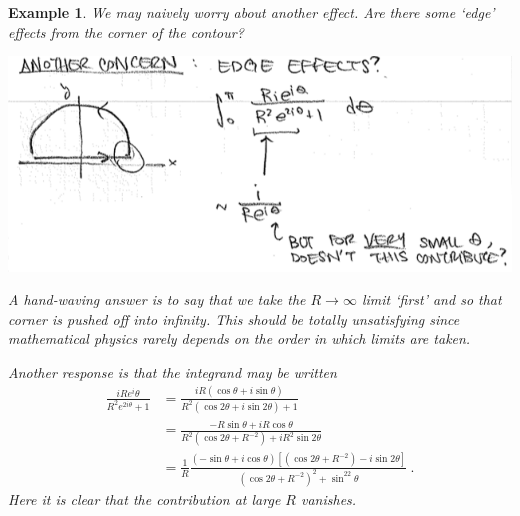 \documentclass[
  11pt,
	colorful,
	raggedright,
]{tufte-style-thesis-flip}
\newtheorem{example}{Example}[section]
\begin{document}
\begin{example}
We may naively worry about another effect. Are there some `edge' effects from the corner of the contour?
\begin{center}
\includegraphics[width=.9\textwidth]{figures/Lec_2017_corner.png}
\end{center}
A hand-waving answer is to say that we take the $R\to\infty$ limit `first' and so that corner is pushed off into infinity. This should be totally unsatisfying since mathematical physics \emph{rarely} depends on the order in which limits are taken.  

Another response is that the integrand may be written
\begin{align}
  \frac{iR e{^i\theta}}{R^2 e^{2i\theta}+1}
  &=
  \frac{iR \left(\cos\theta + i \sin\theta\right)}{R^2(\cos2\theta + i\sin2\theta)+1}
  \\
  &=
  \frac{-R \sin\theta + iR \cos\theta}{R^2(\cos2\theta +R^{-2}) + iR^2\sin2\theta}
  \\
  &=
  \frac{1}{R}
  \frac{\left(-\sin\theta + i\cos\theta\right)
  \left[(\cos2\theta +R^{-2}) - i\sin2\theta\right]
  }{(\cos2\theta +R^{-2})^2 + \sin^22\theta} \ .
\end{align}
Here it is clear that the contribution at large $R$ vanishes.
\end{example}
\end{document}
